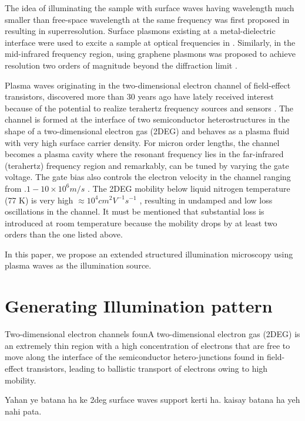 \documentclass[11pt]{article}
\begin{document}
The idea of illuminating the sample with surface waves having wavelength much smaller than free-space wavelength at the same frequency was first proposed in \cite{Nassenstein_1970} resulting in superresolution. Surface plasmons existing at a metal-dielectric interface were used to excite a sample at optical frequencies in \cite{Wei_2010}. Similarly, in the mid-infrared frequency region, using graphene plasmons was proposed to achieve resolution two orders of magnitude beyond  the diffraction limit \cite{Zeng_2014}.

Plasma waves originating in the two-dimensional electron channel of field-effect transistors, discovered more than 30 years ago have lately received interest because of the potential to realize terahertz frequency sources and sensors \cite{Dyakonov_1993,Dyakonov_1996,Popov_2008,Otsuji_2006,Muravjov_2010}. The channel is formed at the interface of two semiconductor heterostructures in the shape of a two-dimensional electron gas (2DEG) and behaves as a plasma fluid with very high surface carrier density. For micron order lengths, the channel becomes a plasma cavity where the resonant frequency lies in the far-infrared (terahertz) frequency region and remarkably, can be tuned by varying the gate voltage. The gate bias also controls the electron velocity in the channel ranging from $.1 - 10 \times 10^6 m/s$ \cite{Burke_2000}. The 2DEG mobility below liquid nitrogen temperature (77 K) is very high $\approx 10^4 cm^2 V^{−1} s^{−1}$ \cite{Muravjov_2010}, resulting in undamped and low loss oscillations in the channel. It must be mentioned that substantial loss is introduced at room temperature because the mobility drops by at least two orders than the one listed above.

In this paper, we propose an extended structured illumination microscopy using plasma waves as the illumination source.

\section{Generating Illumination pattern}

Two-dimensional electron channels founA two-dimensional electron gas (2DEG) is an extremely thin region with a high concentration of electrons that are free to move along the interface of the semiconductor hetero-junctions found in field-effect transistors, leading to ballistic transport of electrons owing to high mobility.

Yahan ye batana ha ke 2deg surface waves support kerti ha. kaisay batana ha yeh nahi pata.
\end{document}
